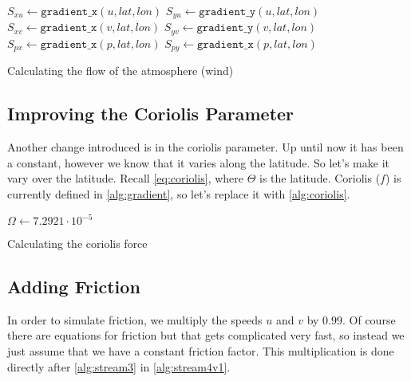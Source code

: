 \begin{algorithm}
    $S_{xu} \leftarrow \texttt{gradient\_x}(u, lat, lon)$ \;
    $S_{yu} \leftarrow \texttt{gradient\_y}(u, lat, lon)$ \;
    $S_{xv} \leftarrow \texttt{gradient\_x}(v, lat, lon)$ \;
    $S_{yv} \leftarrow \texttt{gradient\_y}(v, lat, lon)$ \;
    $S_{px} \leftarrow \texttt{gradient\_x}(p, lat, lon)$ \;
    $S_{py} \leftarrow \texttt{gradient\_x}(p, lat, lon)$ \;
    \caption{Calculating the flow of the atmosphere (wind)}
    \label{alg:stream3}
\end{algorithm}

\subsection{Improving the Coriolis Parameter}
Another change introduced is in the coriolis parameter. Up until now it has been a constant, however we know that it varies along the latitude. So let's make it vary over the latitude. Recall 
\autoref{eq:coriolis}, where $\Theta$ is the latitude. Coriolis ($f$) is currently defined in \autoref{alg:gradient}, so let's replace it with \autoref{alg:coriolis}.

\begin{algorithm}
    \SetAlgoLined
    $\Omega \leftarrow 7.2921 \cdot 10^{-5}$ \;

    \caption{Calculating the coriolis force}
    \label{alg:coriolis}
\end{algorithm}

\subsection{Adding Friction}
In order to simulate friction, we multiply the speeds $u$ and $v$ by $0.99$. Of course there are equations for friction but that gets complicated very fast, so instead we just assume that we
have a constant friction factor. This multiplication is done directly after \autoref{alg:stream3} in \autoref{alg:stream4v1}.

